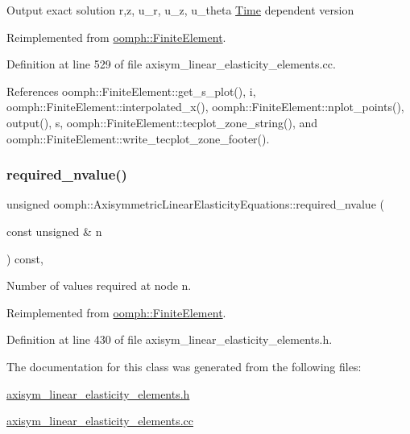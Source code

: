 Output exact solution r,z, u\+\_\+r, u\+\_\+z, u\+\_\+theta \hyperlink{classoomph_1_1Time}{Time} dependent version 

Reimplemented from \hyperlink{classoomph_1_1FiniteElement_a2a8426dccd57b927be0ae0eec00d0479}{oomph\+::\+Finite\+Element}.



Definition at line 529 of file axisym\+\_\+linear\+\_\+elasticity\+\_\+elements.\+cc.



References oomph\+::\+Finite\+Element\+::get\+\_\+s\+\_\+plot(), i, oomph\+::\+Finite\+Element\+::interpolated\+\_\+x(), oomph\+::\+Finite\+Element\+::nplot\+\_\+points(), output(), s, oomph\+::\+Finite\+Element\+::tecplot\+\_\+zone\+\_\+string(), and oomph\+::\+Finite\+Element\+::write\+\_\+tecplot\+\_\+zone\+\_\+footer().

\mbox{\label{classoomph_1_1AxisymmetricLinearElasticityEquations_a9545ca241d42981a9d3561857af7cbb9}} 
\subsubsection{\texorpdfstring{required\+\_\+nvalue()}{required\_nvalue()}}
{\footnotesize\ttfamily unsigned oomph\+::\+Axisymmetric\+Linear\+Elasticity\+Equations\+::required\+\_\+nvalue (\begin{DoxyParamCaption}\item[{const unsigned \&}]{n }\end{DoxyParamCaption}) const\hspace{0.3cm}{\ttfamily [inline]}, {\ttfamily [virtual]}}



Number of values required at node n. 



Reimplemented from \hyperlink{classoomph_1_1FiniteElement_a56610c60d5bc2d7c27407a1455471b1a}{oomph\+::\+Finite\+Element}.



Definition at line 430 of file axisym\+\_\+linear\+\_\+elasticity\+\_\+elements.\+h.



The documentation for this class was generated from the following files\+:\begin{DoxyCompactItemize}
\item 
\hyperlink{axisym__linear__elasticity__elements_8h}{axisym\+\_\+linear\+\_\+elasticity\+\_\+elements.\+h}\item 
\hyperlink{axisym__linear__elasticity__elements_8cc}{axisym\+\_\+linear\+\_\+elasticity\+\_\+elements.\+cc}\end{DoxyCompactItemize}
